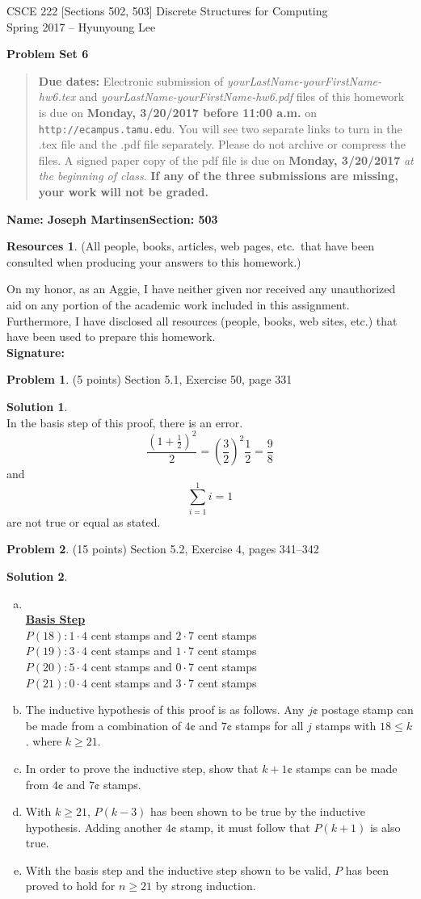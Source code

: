 \documentclass{article}
\theoremstyle{definition}
\newtheorem{problem}{Problem}
\newtheorem*{solution}{Solution}
\newtheorem*{resources}{Resources}
\newcommand{\name}[2]{\noindent\textbf{Name: #1}\hfill \textbf{Section: #2}}
\newcommand{\honor}{\noindent On my honor, as an Aggie, I have neither
  given nor received any unauthorized aid on any portion of the
  academic work included in this assignment. Furthermore, I have
  disclosed all resources (people, books, web sites, etc.) that have
  been used to prepare this homework. \\[2ex]
 \textbf{Signature:} \underline{\hspace*{10cm}} }
\newcommand{\problemset}[1]{\begin{center}\textbf{Problem Set #1}\end{center}}
\newcommand{\duedate}[2]{\begin{quote}\textbf{Due dates:} Electronic
    submission of \textsl{yourLastName-yourFirstName-hw6.tex} and 
    \textsl{yourLastName-yourFirstName-hw6.pdf} files of this homework is due on
    \textbf{#1} on \texttt{http://ecampus.tamu.edu}. You will see two separate links
    to turn in the .tex file and the .pdf file separately. Please do not archive or compress the files.  
    A signed paper copy of the pdf file is due on \textbf{#2} \textsl{at the beginning of class}.
    \textbf{If any of the three submissions are missing, your work will not be graded.}\end{quote} }
\begin{document}
\vspace*{-15mm}
\begin{center}
{\large
CSCE 222 [Sections 502, 503] Discrete Structures for Computing\\[.5ex]
Spring 2017 -- Hyunyoung Lee\\}
\end{center}
\problemset{6}
\duedate{Monday, 3/20/2017 before 11:00 a.m.}{Monday, 3/20/2017}
\name{Joseph Martinsen}{503}
\begin{resources} (All people, books, articles, web pages, etc.\ that
  have been consulted when producing your answers to this homework.)
\end{resources}
\honor

\smallskip

\begin{problem} (5 points) 
Section 5.1, Exercise 50, page 331
\end{problem}
\begin{solution} \ \\
In the basis step of this proof, there is an error. $$\displaystyle \dfrac{(1 + \frac{1}{2})^2}{2} = \left(\dfrac{3}{2} \right)^2 \dfrac{1}{2} = \dfrac{9}{8}$$ and $$\displaystyle \sum_{i=1}^1 i = 1$$ are not true or equal as stated.
\end{solution}

\begin{problem} (15 points) 
Section 5.2, Exercise 4, pages 341--342
\end{problem}
\begin{solution}\ \\
\begin{enumerate}[a)]
  \item \ \\
  \underline{\textbf{Basis Step}} \\
  $P(18):  1 \cdot 4$ cent stamps and $2 \cdot 7$ cent stamps \\
  $P(19):  3 \cdot 4$ cent stamps and $1 \cdot 7$ cent stamps \\
  $P(20):  5 \cdot 4$ cent stamps and $0 \cdot 7$ cent stamps \\
  $P(21):  0 \cdot 4$ cent stamps and $3 \cdot 7$ cent stamps
  
  \item
  The inductive hypothesis of this proof is as follows. Any $j \cent $ postage stamp can be made from a combination of $4\cent$ and $7\cent$ stamps for all $j$ stamps with $ 18 \leq k$. where $k \ge 21$.
  
  \item
  In order to prove the inductive step, show that $k+1 \cent$ stamps can be made from $4\cent$ and $7 \cent$ stamps.
  
  \item
  With $k \ge 21$, $P(k-3)$ has been shown to be true by the inductive hypothesis. Adding another $4 \cent$ stamp, it must follow that $P(k+1)$ is also true. 
  
  \item
  With the basis step and the inductive step shown to be valid, $P$ has been proved to hold for $n \ge 21$ by strong induction.
\end{enumerate}
\end{solution}
\end{document}
